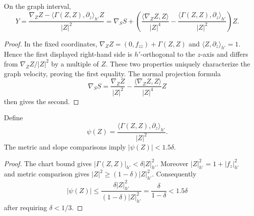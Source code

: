\begin{theorem}
\label{lem:graph-flow-velocity-identities}
\notready
On the graph interval,
\[
 Y=\frac{\nabla_ZZ-\langle\Gamma(Z,Z),\partial_z\rangle_{h'}Z}{|Z|^2}
 =\nabla_SS+\left(
 \frac{\langle\nabla_ZZ,Z\rangle}{|Z|^4}
 -\frac{\langle\Gamma(Z,Z),\partial_z\rangle_{h'}}{|Z|^2}
 \right)Z.
\]
\end{theorem}
\begin{proof}
In the fixed coordinates,
$\nabla_ZZ=(0,f_{zz})+\Gamma(Z,Z)$ and
$\langle Z,\partial_z\rangle_{h'}=1$.  Hence the first displayed
right-hand side is $h'$-orthogonal to the $z$-axis and differs from
$\nabla_ZZ/|Z|^2$ by a multiple of $Z$.  These two properties uniquely
characterize the graph velocity, proving the first equality.  The normal
projection formula
\[
 \nabla_SS=\frac{\nabla_ZZ}{|Z|^2}
 -\frac{\langle\nabla_ZZ,Z\rangle}{|Z|^4}Z
\]
then gives the second.
\end{proof}

\begin{definition}
\label{def:graph-flow-connection-drift}
\notready
Define
\[
 \psi(Z)=\frac{\langle\Gamma(Z,Z),\partial_z\rangle_{h'}}{|Z|^2}.
\]
The metric and slope comparisons imply $|\psi(Z)|<1.5\delta$.
\end{definition}
\begin{proof}
The chart bound gives
$|\Gamma(Z,Z)|_{h'}<\delta|Z|_{h'}^2$.  Moreover
$|Z|_{h'}^2=1+|f_z|_{h'}^2$ and metric comparison gives
$|Z|^2\ge(1-\delta)|Z|_{h'}^2$.  Consequently
\[
 |\psi(Z)|
 \le\frac{\delta|Z|_{h'}^2}{(1-\delta)|Z|_{h'}^2}
 =\frac\delta{1-\delta}<1.5\delta
\]
after requiring $\delta<1/3$.
\end{proof}

